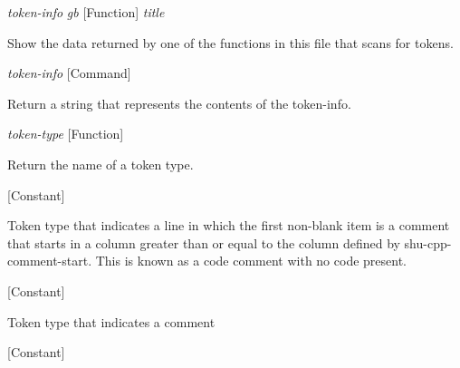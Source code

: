 \vspace{1em}
\noindent
{}
\usebox{\funcname}\emph{token-info} \emph{gb}
 \hfill [Function]
\hspace*{\wd\funcname}\emph{title}

\begin{doc-string}
Show the data returned by one of the functions in this file that scans for tokens.
\end{doc-string}

\vspace{1em}
\noindent
{}
\usebox{\funcname}\emph{token-info}
 \hfill [Command]

\begin{doc-string}
Return a string that represents the contents of the token-info.
\end{doc-string}

\vspace{1em}
\noindent
{}
\usebox{\funcname}\emph{token-type}
 \hfill [Function]

\begin{doc-string}
Return the name of a token type.
\end{doc-string}

\vspace{1em}
\noindent
{}
\usebox{\funcname}
 \hfill [Constant]

\begin{doc-string}
Token type that indicates a line in which the first non-blank item is a
comment that starts in a column greater than or equal to the column defined
by shu-cpp-comment-start.  This is known as a code comment with no code present.
\end{doc-string}

\vspace{1em}
\noindent
{}
\usebox{\funcname}
 \hfill [Constant]

\begin{doc-string}
Token type that indicates a comment
\end{doc-string}

\vspace{1em}
\noindent
{}
\usebox{\funcname}
 \hfill [Constant]


